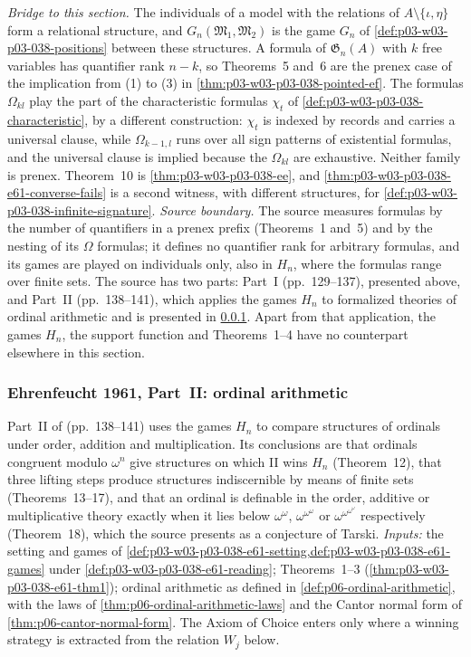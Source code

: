 \emph{Bridge to this section.} The individuals of a model with the relations
of \(A\setminus\{\iota,\eta\}\) form a relational structure, and
\(G_n(\mathfrak M_1,\mathfrak M_2)\) is the game
\(G_n\) of \cref{def:p03-w03-p03-038-positions} between these structures.
A formula of \(\mathfrak G_n(A)\) with \(k\) free variables has quantifier
rank \(n-k\), so Theorems~5 and~6 are the prenex case of the implication
from (1) to (3) in \cref{thm:p03-w03-p03-038-pointed-ef}. The formulas
\(\Omega_{kl}\) play the part of the characteristic formulas
\(\chi_t\) of \cref{def:p03-w03-p03-038-characteristic}, by a different
construction: \(\chi_t\) is indexed by records and carries a universal
clause, while \(\Omega_{k-1,l}\) runs over all sign patterns of existential
formulas, and the universal clause is implied because the
\(\Omega_{kl}\) are exhaustive. Neither family is prenex. Theorem~10 is
\cref{thm:p03-w03-p03-038-ee}, and
\cref{thm:p03-w03-p03-038-e61-converse-fails} is a second witness, with
different structures, for \cref{def:p03-w03-p03-038-infinite-signature}.
\emph{Source boundary.} The source measures formulas by the number of
quantifiers in a prenex prefix (Theorems~1 and~5) and by the nesting of
its \(\Omega\) formulas; it defines no quantifier rank for arbitrary
formulas, and its games are played on individuals only, also in \(H_n\),
where the formulas range over finite sets. The source has two parts:
Part~I (pp.~129--137), presented above, and Part~II (pp.~138--141), which
applies the games \(H_n\) to formalized theories of ordinal arithmetic and
is presented in \cref{sec:p03-w03-p03-038-e61-ordinals}. Apart from that
application, the games \(H_n\), the support function and Theorems~1--4 have
no counterpart elsewhere in this section.

\subsubsection{Ehrenfeucht 1961, Part~II: ordinal arithmetic}
\label{sec:p03-w03-p03-038-e61-ordinals}

Part~II of \cite{Ehrenfeucht1961} (pp.~138--141) uses the games \(H_n\) to
compare structures of ordinals under order, addition and multiplication.
Its conclusions are that ordinals congruent modulo \(\omega^n\) give
structures on which II wins \(H_n\) (Theorem~12), that three lifting steps
produce structures indiscernible by means of finite sets (Theorems~13--17),
and that an ordinal is definable in the order, additive or multiplicative
theory exactly when it lies below \(\omega^{\omega}\),
\(\omega^{\omega^{\omega}}\) or \(\omega^{\omega^{\omega^{\omega}}}\)
respectively (Theorem~18), which the source presents as a conjecture of
Tarski. \emph{Inputs:} the setting and games of
\cref{def:p03-w03-p03-038-e61-setting,def:p03-w03-p03-038-e61-games}
under \cref{def:p03-w03-p03-038-e61-reading}; Theorems~1--3
(\cref{thm:p03-w03-p03-038-e61-thm1}); ordinal arithmetic as defined in
\cref{def:p06-ordinal-arithmetic}, with the laws of
\cref{thm:p06-ordinal-arithmetic-laws} and the Cantor normal form of
\cref{thm:p06-cantor-normal-form}. The Axiom of Choice enters only where
a winning strategy is extracted from the relation \(W_j\) below.

